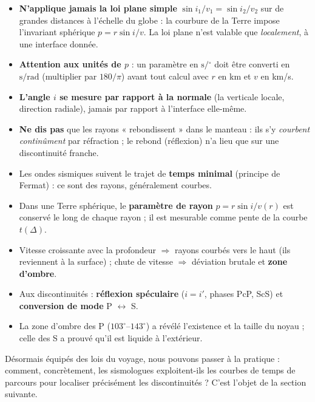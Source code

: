 \documentclass[11pt]{article}
\providecommand{\degree}{^{\circ}}
\begin{document}
\begin{attention}
\begin{itemize}
\item \textbf{N'applique jamais la loi plane simple} $\sin i_1 / v_1 = \sin i_2 / v_2$ sur de grandes distances à l'échelle du globe : la courbure de la Terre impose l'invariant sphérique $p = r\sin i / v$. La loi plane n'est valable que \emph{localement}, à une interface donnée.
\item \textbf{Attention aux unités de $p$} : un paramètre en $\si{\second\per\degree}$ doit être converti en $\si{\second\per\radian}$ (multiplier par $180/\pi$) avant tout calcul avec $r$ en km et $v$ en km/s.
\item \textbf{L'angle $i$ se mesure par rapport à la normale} (la verticale locale, direction radiale), jamais par rapport à l'interface elle-même.
\item \textbf{Ne dis pas} que les rayons « rebondissent » dans le manteau : ils s'y \emph{courbent continûment} par réfraction ; le rebond (réflexion) n'a lieu que sur une discontinuité franche.
\end{itemize}
\end{attention}

\begin{aretenir}
\begin{itemize}
\item Les ondes sismiques suivent le trajet de \textbf{temps minimal} (principe de Fermat) : ce sont des rayons, généralement courbes.
\item Dans une Terre sphérique, le \textbf{paramètre de rayon} $p = r\sin i / v(r)$ est conservé le long de chaque rayon ; il est mesurable comme pente de la courbe $t(\Delta)$.
\item Vitesse croissante avec la profondeur $\Rightarrow$ rayons courbés vers le haut (ils reviennent à la surface) ; chute de vitesse $\Rightarrow$ déviation brutale et \textbf{zone d'ombre}.
\item Aux discontinuités : \textbf{réflexion spéculaire} ($i = i'$, phases PcP, ScS) et \textbf{conversion de mode} P $\leftrightarrow$ S.
\item La zone d'ombre des P ($103^{\circ}$--$143^{\circ}$) a révélé l'existence et la taille du noyau ; celle des S a prouvé qu'il est liquide à l'extérieur.
\end{itemize}
\end{aretenir}

Désormais équipés des lois du voyage, nous pouvons passer à la pratique : comment, concrètement, les sismologues exploitent-ils les courbes de temps de parcours pour localiser précisément les discontinuités ? C'est l'objet de la section suivante.
\end{document}
